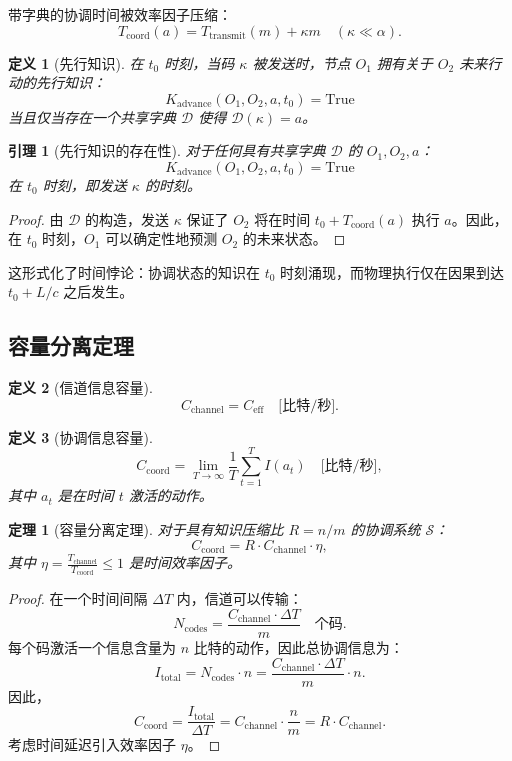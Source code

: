 \documentclass[11pt,a4paper]{article}
\newtheorem{theorem}{定理}
\newtheorem{lemma}{引理}
\newtheorem{definition}{定义}
\begin{document}
	带字典的协调时间被效率因子压缩：
	\[
	T_{\text{coord}}(a) = T_{\text{transmit}}(m) + \kappa m \quad (\kappa \ll \alpha).
	\]
	
	\begin{definition}[先行知识]
		在 $t_0$ 时刻，当码 $\kappa$ 被发送时，节点 $O_1$ 拥有关于 $O_2$ 未来行动的先行知识：
		\[
		K_{\text{advance}}(O_1, O_2, a, t_0) = \text{True}
		\]
		当且仅当存在一个共享字典 $\mathcal{D}$ 使得 $\mathcal{D}(\kappa) = a$。
	\end{definition}
	
	\begin{lemma}[先行知识的存在性]
		\label{lem:advance-knowledge}
		对于任何具有共享字典 $\mathcal{D}$ 的 $O_1, O_2, a$：
		\[
		K_{\text{advance}}(O_1, O_2, a, t_0) = \text{True}
		\]
		在 $t_0$ 时刻，即发送 $\kappa$ 的时刻。
	\end{lemma}
	
	\begin{proof}
		由 $\mathcal{D}$ 的构造，发送 $\kappa$ 保证了 $O_2$ 将在时间 $t_0 + T_{\text{coord}}(a)$ 执行 $a$。因此，在 $t_0$ 时刻，$O_1$ 可以确定性地预测 $O_2$ 的未来状态。
	\end{proof}
	
	这形式化了时间悖论：协调状态的知识在 $t_0$ 时刻涌现，而物理执行仅在因果到达 $t_0 + L/c$ 之后发生。
	
	\subsection{容量分离定理}
	
	\begin{definition}[信道信息容量]
		\[
		C_{\text{channel}} = C_{\text{eff}} \quad \text{[比特/秒]}.
		\]
	\end{definition}
	
	\begin{definition}[协调信息容量]
		\[
		C_{\text{coord}} = \lim_{T \to \infty} \frac{1}{T} \sum_{t=1}^{T} I(a_t) \quad \text{[比特/秒]},
		\]
		其中 $a_t$ 是在时间 $t$ 激活的动作。
	\end{definition}
	
	\begin{theorem}[容量分离定理]
		\label{thm:capacity-separation}
		对于具有知识压缩比 $R = n/m$ 的协调系统 $\mathcal{S}$：
		\[
		C_{\text{coord}} = R \cdot C_{\text{channel}} \cdot \eta,
		\]
		其中 $\eta = \frac{T_{\text{channel}}}{T_{\text{coord}}} \leq 1$ 是时间效率因子。
	\end{theorem}
	
	\begin{proof}
		在一个时间间隔 $\Delta T$ 内，信道可以传输：
		\[
		N_{\text{codes}} = \frac{C_{\text{channel}} \cdot \Delta T}{m} \quad \text{个码}.
		\]
		每个码激活一个信息含量为 $n$ 比特的动作，因此总协调信息为：
		\[
		I_{\text{total}} = N_{\text{codes}} \cdot n = \frac{C_{\text{channel}} \cdot \Delta T}{m} \cdot n.
		\]
		因此，
		\[
		C_{\text{coord}} = \frac{I_{\text{total}}}{\Delta T} = C_{\text{channel}} \cdot \frac{n}{m} = R \cdot C_{\text{channel}}.
		\]
		考虑时间延迟引入效率因子 $\eta$。
	\end{proof}
	
\end{document}
